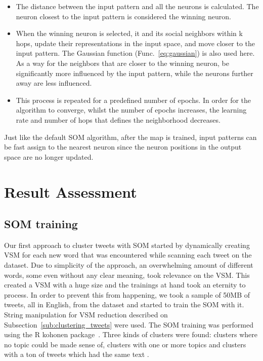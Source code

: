 \documentclass[journal]{IEEEtran}
\begin{document}
\begin{itemize}
  \item The distance between the input pattern and all the neurons is calculated. The neuron closest to the input pattern is considered the winning neuron.
  \item When the winning neuron is selected, it and its social neighbors within k hops, update their representations in the input space, and move closer to the input pattern. The Gaussian function (Func.~\ref{eq:gaussian}) is also used here. As a way for the neighbors that are closer to the winning neuron, be significantly more influenced by the input pattern, while the neurons further away are less influenced. 
  \item This process is repeated for a predefined number of epochs. In order for the algorithm to converge, whilst the number of epochs increases, the learning rate and number of hops that defines the neighborhood decreases.
\end{itemize}

Just like the default \ac{SOM} algorithm, after the map is trained, input patterns can be fast assign to the nearest neuron since the neuron positions in the output space are no longer updated.
 
\section{Result Assessment}
\label{sec:result_assessment}

\subsection{SOM training}
\label{sub:clustering_tweets_with_soms}
Our first approach to cluster tweets with \ac{SOM} started by dynamically creating \ac{VSM} for each new word that was encountered while scanning each tweet on the dataset. Due to simplicity of the approach, an overwhelming amount of different words, some even without any clear meaning, took relevance on the \ac{VSM}. 
This created a \ac{VSM} with a huge size and the trainings at hand took an eternity to process. In order to prevent this from happening, we took a sample of 50MB of tweets, all in English, from the dataset and started to train the \ac{SOM} with it. String manipulation for \ac{VSM} reduction described on Subsection~\ref{sub:clustering_tweets} were used.
The \ac{SOM} training was performed using the R kohonen package~\cite{rsom}. Three kinds of clusters were found: clusters where no topic could be made sense of, clusters with one or more topics and clusters with a ton of tweets which had the same text .
\end{document}
